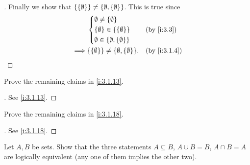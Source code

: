 \begin{proof}[]
  Finally we show that \(\left\lbrace\left\lbrace\emptyset\right\rbrace\right\rbrace \neq \left\lbrace\emptyset, \left\lbrace\emptyset\right\rbrace\right\rbrace\).
  This is true since
  \begin{align*}
             & \begin{dcases}
                 \emptyset \neq \set{\emptyset}                 \\
                 \set{\emptyset} \in \set{\set{\emptyset}}      \\
                 \emptyset \in \set{\emptyset, \set{\emptyset}} \\
               \end{dcases}    &  & \by{i:3.3}                         \\
    \implies & \set{\set{\emptyset}} \neq \set{\emptyset, \set{\emptyset}}. &  & \by{i:3.1.4}
  \end{align*}
\end{proof}

\begin{ex}\label{i:ex:3.1.3}
  Prove the remaining claims in \cref{i:3.1.13}.
\end{ex}

\begin{proof}[]
  See \cref{i:3.1.13}.
\end{proof}

\begin{ex}\label{i:ex:3.1.4}
  Prove the remaining claims in \cref{i:3.1.18}.
\end{ex}

\begin{proof}[]
  See \cref{i:3.1.18}.
\end{proof}

\begin{ex}\label{i:ex:3.1.5}
  Let \(A, B\) be sets.
  Show that the three statements \(A \subseteq B\), \(A \cup B = B\), \(A \cap B = A\) are logically equivalent (any one of them implies the other two).
\end{ex}

